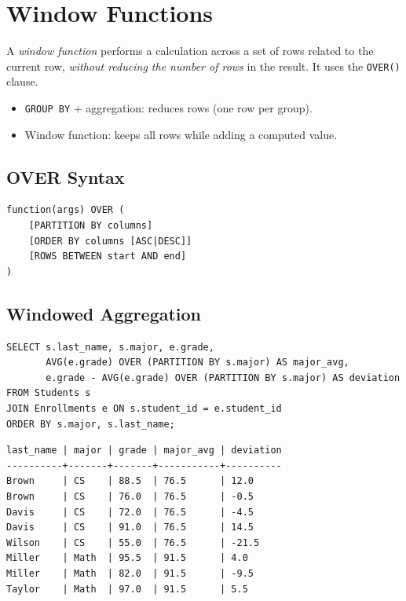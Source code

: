 \section{Window Functions}

\begin{definition}
A \emph{window function} performs a calculation across a set of rows related
to the current row, \emph{without reducing the number of rows} in the result.
It uses the \texttt{OVER()} clause.
\end{definition}

\begin{theorem}
\begin{itemize}
    \item \texttt{GROUP BY} + aggregation: reduces rows (one row per group).
    \item Window function: keeps all rows while adding a computed value.
\end{itemize}
\end{theorem}

\subsection{OVER Syntax}

\begin{keyformulas}[title=\textbf{Window Function Syntax}]
\begin{verbatim}
function(args) OVER (
    [PARTITION BY columns]
    [ORDER BY columns [ASC|DESC]]
    [ROWS BETWEEN start AND end]
)
\end{verbatim}
\end{keyformulas}

\subsection{Windowed Aggregation}

\begin{codeblock}[title=\textbf{Windowed Average by Major}]
\begin{verbatim}
SELECT s.last_name, s.major, e.grade,
       AVG(e.grade) OVER (PARTITION BY s.major) AS major_avg,
       e.grade - AVG(e.grade) OVER (PARTITION BY s.major) AS deviation
FROM Students s
JOIN Enrollments e ON s.student_id = e.student_id
ORDER BY s.major, s.last_name;
\end{verbatim}
\end{codeblock}

\begin{codeoutput}
\begin{verbatim}
last_name | major | grade | major_avg | deviation
----------+-------+-------+-----------+----------
Brown     | CS    | 88.5  | 76.5      | 12.0
Brown     | CS    | 76.0  | 76.5      | -0.5
Davis     | CS    | 72.0  | 76.5      | -4.5
Davis     | CS    | 91.0  | 76.5      | 14.5
Wilson    | CS    | 55.0  | 76.5      | -21.5
Miller    | Math  | 95.5  | 91.5      | 4.0
Miller    | Math  | 82.0  | 91.5      | -9.5
Taylor    | Math  | 97.0  | 91.5      | 5.5
\end{verbatim}
\end{codeoutput}

